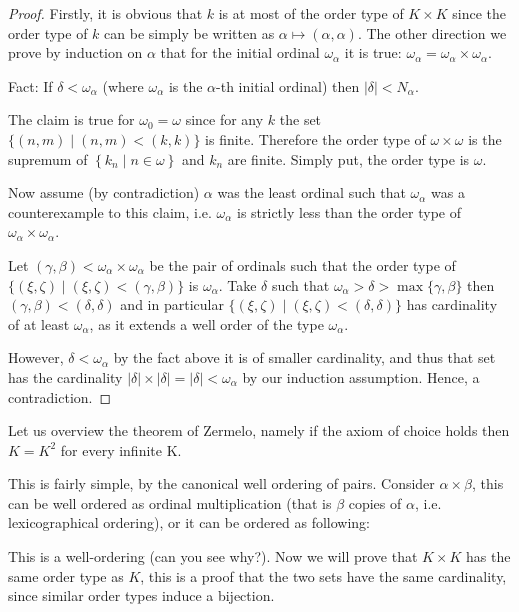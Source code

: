 \begin{proof}
    Firstly, it is obvious that $k$ is at most of the order type of $K \times K$ since the order type of $k$ can be simply be written as $\alpha \mapsto(\alpha, \alpha)$. The other direction we prove by induction on $\alpha$ that for the initial ordinal $\omega_\alpha$ it is true: $\omega_\alpha=\omega_\alpha \times \omega_\alpha$.

Fact: If $\delta<\omega_\alpha$ (where $\omega_\alpha$ is the $\alpha$-th initial ordinal) then $|\delta|<N_\alpha$.

The claim is true for $\omega_0=\omega$ since for any $k$ the set $\{(n, m) \mid(n, m)<(k, k)\}$ is finite. Therefore the order type of $\omega \times \omega$ is the supremum of $\left\{k_n \mid n \in \omega\right\}$ and $k_n$ are finite. Simply put, the order type is $\omega$.

Now assume (by contradiction) $\alpha$ was the least ordinal such that $\omega_\alpha$ was a counterexample to this claim, i.e. $\omega_\alpha$ is strictly less than the order type of $\omega_\alpha \times \omega_\alpha$.

Let $(\gamma, \beta)<\omega_\alpha \times \omega_\alpha$ be the pair of ordinals such that the order type of $\{(\xi, \zeta) \mid(\xi, \zeta)<(\gamma, \beta)\}$ is $\omega_\alpha$.
Take $\delta$ such that $\omega_\alpha>\delta>\max \{\gamma, \beta\}$ then $(\gamma, \beta)<(\delta, \delta)$ and in particular $\{(\xi, \zeta) \mid(\xi, \zeta)<(\delta, \delta)\}$ has cardinality of at least $\omega_\alpha$, as it extends a well order of the type $\omega_\alpha$.

However, $\delta<\omega_\alpha$ by the fact above it is of smaller cardinality, and thus that set has the cardinality $|\delta| \times|\delta|=|\delta|<\omega_\alpha$ by our induction assumption. Hence, a contradiction.
\end{proof}



Let us overview the theorem of Zermelo, namely if the axiom of choice holds then $K=K^2$ for every infinite K.

This is fairly simple, by the canonical well ordering of pairs.
Consider $\alpha \times \beta$, this can be well ordered as ordinal multiplication (that is $\beta$ copies of $\alpha$, i.e. lexicographical ordering), or it can be ordered as following:


This is a well-ordering (can you see why?). Now we will prove that $K \times K$ has the same order type as $K$, this is a proof that the two sets have the same cardinality, since similar order types induce a bijection.


